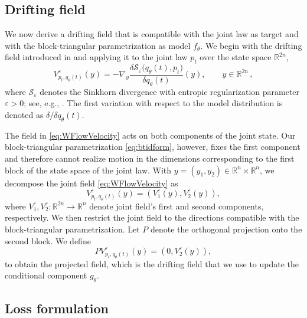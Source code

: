 \documentclass[10pt,a4paper]{amsart}
\newcommand{\R}{\mathbb{R}}
\begin{document}
\subsection{Drifting field}
\label{subsec:ProjectedWFlow}
We now derive a drifting field that is compatible with the joint law as target and with the block-triangular parametrization as model $f_{\theta}$. 
We begin with the drifting field introduced in \cite{han2026wflow} and applying it to the joint law $p_t$ over the state space $\R^{2n}$, 
\begin{equation}\label{eq:WFlowVelocity}
        V_{p_t,q_{\theta}(t)}^{\varepsilon}(y)
        =
        -
        \nabla_y
        \frac{\delta
        \mathcal{S}_{\varepsilon}
        \big(q_{\theta}(t),p_t\big)}
        {\delta q_{\theta}(t)}(y),
        \qquad
        y\in\R^{2n}\,,
    \end{equation}
where $\mathcal{S}_{\varepsilon}$ denotes the Sinkhorn divergence with entropic regularization parameter $\varepsilon>0$; see, e.g., \cite{pmlr-v89-feydy19a}.  The first variation with respect to the model distribution is denoted as $\delta/\delta q_{\theta}(t)$. 

The field in \eqref{eq:WFlowVelocity} acts on both components of the
    joint state. Our block-triangular parametrization \eqref{eq:btidform},
    however, fixes the first component     and therefore cannot realize motion in the dimensions corresponding to the first block of the state space of the joint law.
 With $y=(y_1,y_2)\in\R^n\times\R^n$, we decompose the joint field \eqref{eq:WFlowVelocity} as
    \[
        V_{p_t,q_{\theta}(t)}^{\varepsilon}(y)
        =
        \left(
            V_1^{\varepsilon}(y),
            V_2^{\varepsilon}(y)
        \right),
    \]
    where $V_1^{\varepsilon},V_2^{\varepsilon}:\R^{2n}\to\R^n$ denote joint field's
    first and second components, respectively.
 We then restrict the joint field to the directions compatible with the block-triangular parametrization. Let $P$ denote the orthogonal projection onto the second block. We define
\begin{equation}\label{eq:ProjectedDrift}
        P V_{p_t,q_{\theta}(t)}^{\varepsilon}(y)
        =
        \left(
            0,
            V_2^{\varepsilon}(y)
        \right),
    \end{equation}
    to obtain the projected field, which is the drifting field that we use to update the conditional component $g_{\theta}$.



\subsection{Loss formulation}
\label{subsec:LossFormulation}
\end{document}
